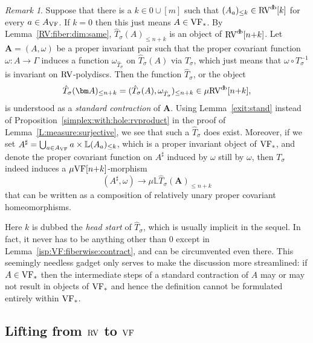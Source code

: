 \documentclass[12pt]{amsart}
\newcommand{\memph}[1]{{\color{magenta}\emph{#1}}}
\theoremstyle{plain}
\theoremstyle{definition}
\theoremstyle{remark}
\newtheorem{rem}[thm]{Remark}
\numberwithin{equation}{section}
\theoremstyle{plain}
\newcommand{\VF}{\textup{VF}}
\newcommand{\RV}{\textup{RV}}
\newcommand{\0}{\emptyset}
\newcommand{\bb}[1]{\mathbb{#1}}
\newcommand{\fun}{\longrightarrow}
\newcommand{\mVF}{{\mu}{\VF}}
\newcommand{\mRV}{{\mu}{\RV}}
\newcommand{\mL}{{\mu}{\bb L}}
\DeclareMathOperator{\db}{d \! b}
\begin{document}
\begin{rem}\label{stand:vol}
Suppose that there is a $k \in 0 \cup [m]$ such that  $(A_{a})_{\leq k} \in \RV^{\db}[k]$  for  every $a \in A_{\VF}$. If $k=0$ then this just means $A \in \VF_*$. By Lemma~\ref{RV:fiber:dim:same}, $\hat T_{\sigma}(A)_{\leq n+k}$ is an object of $\RV^{\db}[n{+}k]$. Let $\bm A = (A, \omega)$ be a proper invariant pair such that the proper covariant function $\omega : A \fun \Gamma$   induces a function $\omega_{\hat T_{\sigma}}$ on $\hat T_{\sigma}(A)$ via $T_{\sigma}$, which just means that $\omega \circ T^{-1}_{\sigma}$ is invariant on $\RV$-polydiscs. Then the function $\hat T_{\sigma}$, or the object
\[
\hat T_{\sigma}(\bm A)_{\leq n+k} = (\hat T_{\sigma}(A), \omega_{\hat T_{\sigma}})_{\leq n+k} \in \mRV^{\db}[n{+}k],
\]
is understood as  a \memph{standard contraction} of $\bm A$. Using Lemma~\ref{exit:stand} instead of Proposition~\ref{simplex:with:hole:rvproduct} in the proof of Lemma~\ref{L:measure:surjective}, we see that such a $\hat T_{\sigma}$ does exist. Moreover, if we set $A^\sharp = \bigcup_{a \in A_{\VF}} a \times \bb L (A_a)_{\leq k}$, which is a  proper invariant object of $\VF_*$, and denote the  proper covariant function on $A^\sharp$ induced by  $\omega$ still by $\omega$, then  $T_{\sigma}$  indeed induces a $\mVF[n{+}k]$-morphism
\[
(A^\sharp, \omega) \fun {\mL}\hat T_{\sigma}(\bm A)_{\leq n+k}
\]
that can be written as a composition of relatively unary proper covariant homeomorphisms.

Here $k$ is dubbed the \memph{head start} of $\hat T_{\sigma}$, which is usually implicit in the sequel. In fact,  it never has to be anything other than $0$ except in Lemma~\ref{isp:VF:fiberwise:contract}, and can be circumvented even there. This seemingly needless gadget only serves to make the discussion more streamlined: if $A \in \VF_*$ then the intermediate steps of a standard contraction of $A$ may or may not result in objects of $\VF_*$ and hence the definition cannot be formulated entirely within $\VF_*$.
\end{rem}



\subsection{Lifting from $\RV$ to $\VF$}
\end{document}
